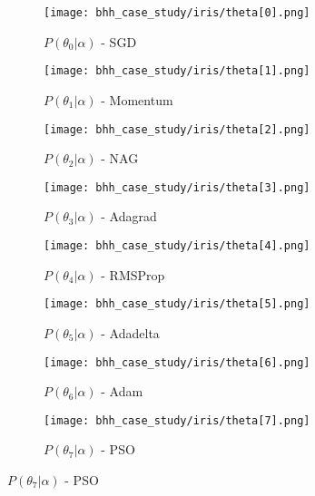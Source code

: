\begin{figure}[htbp]
	\begin{subfigure}{0.5\textwidth}
		\centering
		\texttt{[image: bhh\_case\_study/iris/theta[0].png]}
		\caption{$P(\theta_{0} | \alpha)$ - \Acs{SGD}}
		\label{fig:results:case_study:iris:p_theta:0}
	\end{subfigure}
	\begin{subfigure}{0.5\textwidth}
		\centering
		\texttt{[image: bhh\_case\_study/iris/theta[1].png]}
		\caption{$P(\theta_{1} | \alpha)$ - \Acs{Momentum}}
		\label{fig:results:case_study:iris:p_theta:1}
	\end{subfigure}
	\par\medskip
	\begin{subfigure}{0.5\textwidth}
		\centering
		\texttt{[image: bhh\_case\_study/iris/theta[2].png]}
		\caption{$P(\theta_{2} | \alpha)$ - \Acs{NAG}}
		\label{fig:results:case_study:iris:p_theta:2}
	\end{subfigure}
	\begin{subfigure}{0.5\textwidth}
		\centering
		\texttt{[image: bhh\_case\_study/iris/theta[3].png]}
		\caption{$P(\theta_{3} | \alpha)$ - \Acs{Adagrad}}
		\label{fig:results:case_study:iris:p_theta:3}
	\end{subfigure}
	\par\medskip
	\begin{subfigure}{0.5\textwidth}
		\centering
		\texttt{[image: bhh\_case\_study/iris/theta[4].png]}
		\caption{$P(\theta_{4} | \alpha)$ - \Acs{RMSProp}}
		\label{fig:results:case_study:iris:p_theta:4}
	\end{subfigure}
	\begin{subfigure}{0.5\textwidth}
		\centering
		\texttt{[image: bhh\_case\_study/iris/theta[5].png]}
		\caption{$P(\theta_{5} | \alpha)$ - \Acs{Adadelta}}
		\label{fig:results:case_study:iris:p_theta:5}
	\end{subfigure}
	\par\medskip
	\begin{subfigure}{0.5\textwidth}
		\centering
		\texttt{[image: bhh\_case\_study/iris/theta[6].png]}
		\caption{$P(\theta_{6} | \alpha)$ - \Acs{Adam}}
		\label{fig:results:case_study:iris:p_theta:6}
	\end{subfigure}
	\begin{subfigure}{0.5\textwidth}
		\centering
		\texttt{[image: bhh\_case\_study/iris/theta[7].png]}
		\caption{$P(\theta_{7} | \alpha)$ - \Acs{PSO}}

\end{subfigure}
\end{figure}
